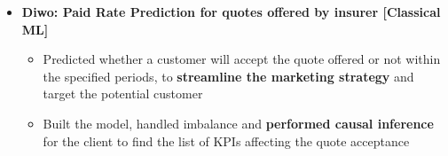 \documentclass[a4paper,10pt]{article}
\newcommand{\isep}{-2 pt}
\newcommand{\lsep}{-0.5cm}
\newcommand{\resheading}[1]{{\small
        {
            \begin{minipage}
                {0.992\textwidth}\textbf{{\textsc{#1 \vphantom{p\^{E}} }}}
                \\[-0.3cm]
                \hrule
            \end{minipage}
            \\[-0.5cm]
        }
 }}
\begin{document}
\begin{itemize}
\item \textbf{Diwo: Paid Rate Prediction for quotes offered by insurer [Classical ML]}  
    \\[-0.6cm]
    \begin{itemize}\itemsep \isep
        \item Predicted whether a customer will accept the quote offered or not within the specified periods, to \textbf{streamline the marketing strategy} and target the potential customer 
        \item Built the model, handled imbalance and \textbf{performed causal inference} for the client to find the list of KPIs affecting the quote acceptance 
    \end{itemize}
\end{itemize}




\end{document}
